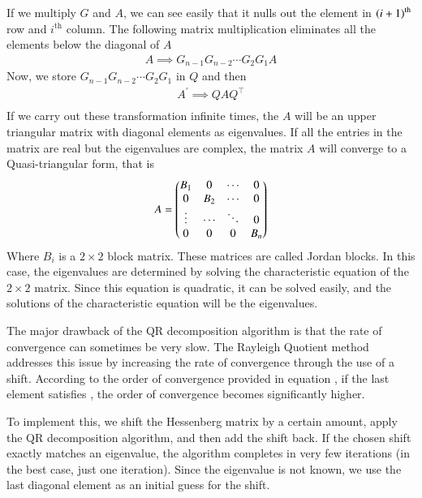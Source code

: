 \documentclass[journal]{IEEEtran}
\begin{document}
If we multiply $G$ and $A$, we can see easily that it nulls out the element in $\left(i+1\right)^{\text{th}}$ row and $i^\text{th}$ column. The following matrix multiplication eliminates all the elements below the diagonal of $A$
\begin{align}
	A \implies G_{n-1}G_{n-2}\cdots G_2G_1A
\end{align}
Now, we store $G_{n-1}G_{n-2}\cdots G_2G_1$ in $Q$ and then
\begin{align}
	A^\prime \implies QAQ^\top\\
\end{align}
If we carry out these transformation infinite times, the $A$ will be an upper triangular matrix with diagonal elements as eigenvalues.
If all the entries in the matrix are real but the eigenvalues are complex, the matrix $A$ will converge to a Quasi-triangular form, that is
\begin{align}
	A = \begin{pmatrix}B_1 & 0 & \cdots & 0 \\
		   0 & B_2 & \cdots & 0\\
		   \vdots & \cdots & \ddots & 0\\
		   0 & 0 & 0 & B_n\end{pmatrix}
\end{align}
Where $B_i$ is a $2 \times 2$ block matrix. These matrices are called Jordan blocks. In this case, the eigenvalues are determined by solving the characteristic equation of the $2 \times 2$ matrix. Since this equation is quadratic, it can be solved easily, and the solutions of the characteristic equation will be the eigenvalues.

The major drawback of the QR decomposition algorithm is that the rate of convergence can sometimes be very slow. The Rayleigh Quotient method addresses this issue by increasing the rate of convergence through the use of a shift. According to the order of convergence provided in equation , if the last element satisfies , the order of convergence becomes significantly higher. 

To implement this, we shift the Hessenberg matrix by a certain amount, apply the QR decomposition algorithm, and then add the shift back. If the chosen shift exactly matches an eigenvalue, the algorithm completes in very few iterations (in the best case, just one iteration). Since the eigenvalue is not known, we use the last diagonal element as an initial guess for the shift.
\end{document}
